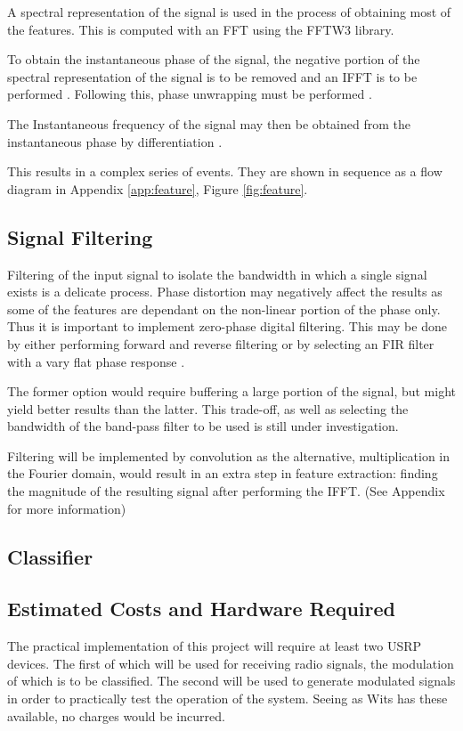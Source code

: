 \documentclass[10pt,twocolumn]{witseiepaper}
\begin{document}
		A spectral representation of the signal is used in the process of obtaining most of the features. This is computed with an FFT using the FFTW3 library. 
		
		To obtain the instantaneous phase of the signal, the negative portion of the spectral representation of the signal is to be removed and an IFFT is to be performed \cite{picinbono1997instantaneous}. Following this, phase unwrapping must be performed \cite{park2009introduction, picinbono1997instantaneous}.

		The Instantaneous frequency of the signal may then be obtained from the instantaneous phase by differentiation \cite{park2009introduction}.

		This results in a complex series of events. They are shown in sequence as a flow diagram in Appendix \ref{app:feature}, Figure \ref{fig:feature}.

	\subsection{Signal Filtering}
		Filtering of the input signal to isolate the bandwidth in which a single signal exists is a delicate process. 
		Phase distortion may negatively affect the results as some of the features are dependant on the non-linear portion of the phase only. 
		Thus it is important to implement zero-phase digital filtering.
		This may be done by either performing forward and reverse filtering or by selecting an FIR filter with a vary flat phase response \cite{sundararajan2003digital}.

		The former option would require buffering a large portion of the signal, but might yield better results than the latter. This trade-off, as well as selecting the bandwidth of the band-pass filter to be used is still under investigation.

		Filtering will be implemented by convolution as the alternative, multiplication in the Fourier domain, would result in an extra step in feature extraction: finding the magnitude of the resulting signal after performing the IFFT. (See Appendix \cite{app:feature} for more information)

	\subsection{Classifier}

	\subsection{Estimated Costs and Hardware Required}
		The practical implementation of this project will require at least two USRP devices. The first of which will be used for receiving radio signals, the modulation of which is to be classified. The second will be used to generate modulated signals in order to practically test the operation of the system. Seeing as Wits has these available, no charges would be incurred.
\end{document}

